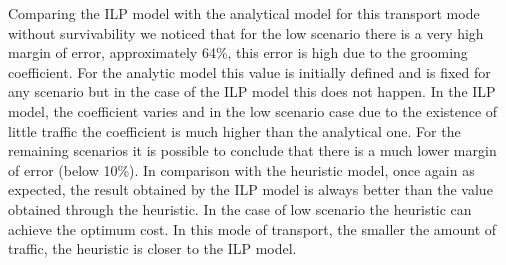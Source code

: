 Comparing the ILP model with the analytical model for this transport mode without survivability we noticed that for the low scenario there is a very high margin of error, approximately 64\%, this error is high due to the grooming coefficient. For the analytic model this value is initially defined and is fixed for any scenario but in the case of the ILP model this does not happen. In the ILP model, the coefficient varies and in the low scenario case due to the existence of little traffic the coefficient is much higher than the analytical one.
For the remaining scenarios it is possible to conclude that there is a much lower margin of error (below 10\%).
In comparison with the heuristic model, once again as expected, the result obtained by the ILP model is always better than the value obtained through the heuristic. In the case of low scenario the heuristic can achieve the optimum cost. In this mode of transport, the smaller the amount of traffic, the heuristic is closer to the ILP model.
